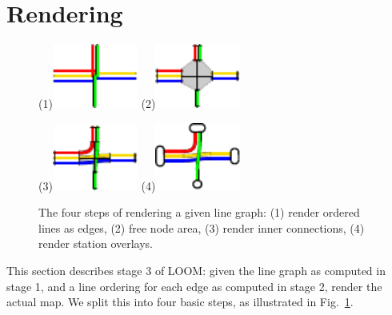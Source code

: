 \documentclass[format=acmsmall, review=false, screen=true]{acmart}
\begin{document}
\section{Rendering}\label{SEC:rendering}
%
\begin{figure}[b]
  \centering
  (1)\includegraphics[width=0.25\textwidth]{figures/render_examples/rendering/render_example1.pdf}
  \hspace{1.5cm}
  (2)\includegraphics[width=0.25\textwidth]{figures/render_examples/rendering/render_example2.pdf}

  \vspace{0.4cm}
  \centering
  (3)\includegraphics[width=0.25\textwidth]{figures/render_examples/rendering/render_example3.pdf}
  \hspace{1.5cm}
  (4)\includegraphics[width=0.25\textwidth]{figures/render_examples/rendering/render_example4.pdf}

	\caption{The four steps of rendering a given line graph: (1) render ordered lines as edges, (2) free node area, (3) render inner connections, (4) render station overlays.}
	\label{FIG:renderingproc}
\end{figure}
This section describes stage 3 of LOOM: given the line graph as computed in stage 1, and a line ordering for each edge as computed in stage 2, render the actual map.
We split this into four basic steps, as illustrated in Fig.~\ref{FIG:renderingproc}.
\end{document}
